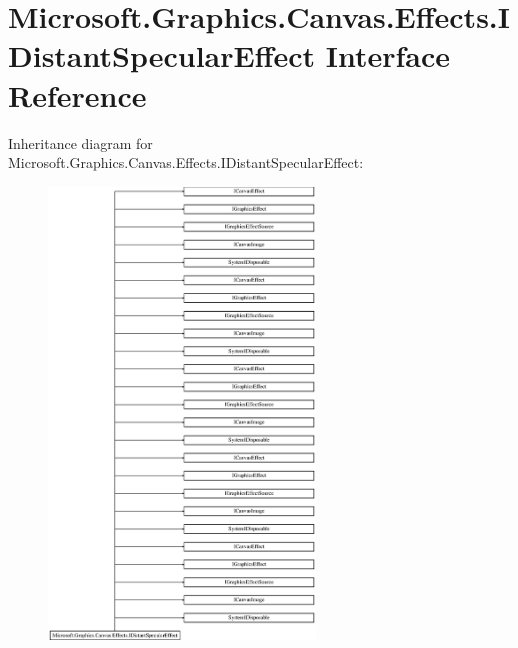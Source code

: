 \hypertarget{interface_microsoft_1_1_graphics_1_1_canvas_1_1_effects_1_1_i_distant_specular_effect}{}\section{Microsoft.\+Graphics.\+Canvas.\+Effects.\+I\+Distant\+Specular\+Effect Interface Reference}
\label{interface_microsoft_1_1_graphics_1_1_canvas_1_1_effects_1_1_i_distant_specular_effect}
Inheritance diagram for Microsoft.\+Graphics.\+Canvas.\+Effects.\+I\+Distant\+Specular\+Effect\+:\begin{figure}[H]
\begin{center}
\leavevmode
\includegraphics[height=12.000000cm]{interface_microsoft_1_1_graphics_1_1_canvas_1_1_effects_1_1_i_distant_specular_effect}
\end{center}
\end{figure}
